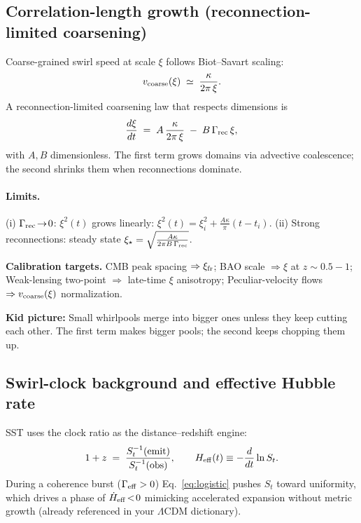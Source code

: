\documentclass[10pt,reprint,aps,onecolumn,nofootinbib]{revtex4-2}
\begin{document}
\subsection*{Correlation-length growth (reconnection-limited coarsening)}
Coarse-grained swirl speed at scale \(\xi\) follows Biot–Savart scaling:
\[
    v_{\rm coarse}(\xi)\;\simeq\;\frac{\kappa}{2\pi\,\xi}.
\]
A reconnection-limited coarsening law that respects dimensions is
\begin{equation}
\frac{d\xi}{dt} \;=\; A\,\frac{\kappa}{2\pi\,\xi}\;-\;B\,\Gamma_{\rm rec}\,\xi,
\label{eq:xi-growth}
\end{equation}
with \(A,B\) dimensionless. The first term grows domains via advective coalescence; the second shrinks them when reconnections dominate.
\paragraph*{Limits.}
(i) \(\Gamma_{\rm rec}\!\to\!0\): \(\xi^2(t)\) grows linearly: \(\xi^2(t)=\xi_i^2+\frac{A\kappa}{\pi}(t-t_i)\).
    (ii) Strong reconnections: steady state \(\xi_\star=\sqrt{\frac{A\kappa}{2\pi B\,\Gamma_{\rm rec}}}\).

    \begin{edgebox}
    \textbf{Calibration targets.}
    CMB peak spacing \(\Rightarrow \xi_{\rm fr}\); BAO scale \(\Rightarrow \xi\) at \(z\!\sim\!0.5\!-\!1\);
    Weak-lensing two-point \(\Rightarrow\) late-time \(\xi\) anisotropy;
    Peculiar-velocity flows \(\Rightarrow v_{\rm coarse}(\xi)\) normalization.
    \end{edgebox}

    \begin{analogynote}
    \textbf{Kid picture:} Small whirlpools merge into bigger ones unless they keep cutting each other. The first term makes bigger pools; the second keeps chopping them up.
    \end{analogynote}

\subsection*{Swirl-clock background and effective Hubble rate}
SST uses the clock ratio as the distance–redshift engine:
\[
    1+z \;=\; \frac{S_t^{-1}({\rm emit})}{S_t^{-1}({\rm obs})},
    \qquad
    H_{\rm eff}(t)\equiv -\frac{d}{dt}\ln S_t.
\]
During a coherence burst (\(\Gamma_{\rm eff}>0\)) Eq.~\eqref{eq:logistic} pushes \(S_t\) toward uniformity, which drives a phase of \(\dot H_{\rm eff}\!<\!0\) mimicking accelerated expansion without metric growth (already referenced in your \(\Lambda\)CDM dictionary).
\end{document}

